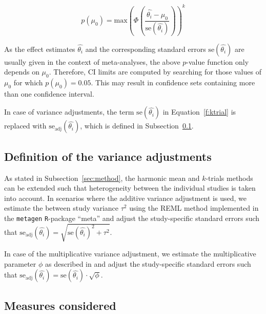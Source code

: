 \documentclass[letterpaper, 12pt]{article}
\begin{document}
\begin{equation}\label{f:ktrial}
p(\mu_0) = \text{max} \left( 
  \Phi \left( \frac{\hat{\theta_i} - \mu_0}{\text{se}(\hat{\theta_{i}})} \right)
  \right)^k
\end{equation}

As the effect estimates $\hat{\theta_i}$ and the corresponding standard
errors $\text{se}(\hat{\theta_i})$ are usually given in the context of
meta-analyses, the above $p$-value function only depends on $\mu_{0}$.
Therefore, CI limits are computed by searching for those values of $\mu_0$ for
which $p(\mu_0) = 0.05$. This may result in confidence sets containing more
than one confidence interval. 

In case of variance adjustments, the term $\text{se}(\hat{\theta_i})$  in
Equation~\ref{f:ktrial} is replaced with
$\text{se}_{\text{adj}}(\hat{\theta_i})$, which is defined in
Subsection~\ref{sec:varadj}.

\subsection{Definition of the variance adjustments} \label{sec:varadj}

As stated in Subsection~\ref{sec:method}, the harmonic mean and $k$-trials
methods can be extended such that heterogeneity between the individual studies
is taken into account. In scenarios where the additive variance adjustment is
used, we estimate the between study variance $\tau^2$ using the REML method
implemented in the \texttt{metagen} \texttt{R}-package ``meta'' and adjust
the study-specific standard errors such that
$\text{se}_{\text{adj}}(\hat{\theta_i}) = \sqrt{\text{se}(\hat{\theta_i})^2 + \tau^2}$.

In case of the multiplicative variance adjustment, we estimate the
multiplicative parameter $\phi$ as described in \citet{mawd:etal:17} and adjust
the study-specific standard errors such that
$\text{se}_{\text{adj}}(\hat{\theta_i}) = \text{se}(\hat{\theta_i}) \cdot \sqrt{\phi}$.

\subsection{Measures considered} \label{sec:meas}
\end{document}
